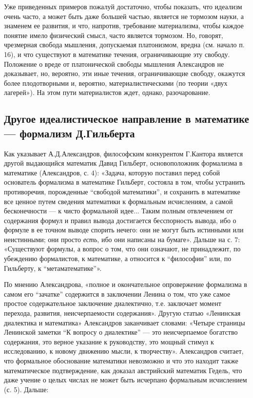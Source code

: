 Уже приведенных примеров пожалуй достаточно, чтобы показать, что
идеализм очень часто, а может быть даже большей частью, является не
тормозом науки, а знаменем ее развития, и что, напротив, требование
материализма, чтобы каждое понятие имело физический смысл, часто
является тормозом. Но, говорят, чрезмерная свобода мышления,
допускаемая платонизмом, вредна (см. начало п. 16), и что существуют в
математике течения, ограничивающие эту свободу. Положение о вреде от
платонической свободы мышления Александров не доказывает, но,
вероятно, эти иные течения, ограничивающие свободу, окажутся более
плодотворными и, вероятно, материалистическими (по теории «двух
лагерей»). На этом пути материалистов ждет, однако, разочарование.

\subsection{Другое идеалистическое направление в математике ---
формализм Д.Гильберта}

Как указывает А.Д.Александров, философским конкурентом Г.Кантора
является другой выдающийся математик Давид Гильберт, основоположник
формализма в математике (Александров, с. 4): «Задача, которую поставил
перед собой основатель формализма в математике Гильберт, состояла в
том, чтобы устранить противоречия, порожденные ``свободой
математики'', и сохранить в математике все ценное путем сведения
математики к формальным исчислениям, а самой бесконечности --- к чисто
формальной идее... Таким полным отвлечением от содержания формул и
правил вывода достигается бесспорность вывода, ибо о формуле в ее
точном выводе спорить нечего: они не могут быть истинными или
неистинными; они просто \emph{есть}, ибо они написаны на бумаге».
Дальше на с. 7: «Существуют формулы, а вопрос о том, что они означают,
не принадлежит, по убеждению формалистов, к математике, а относится к
``философии'' или, по Гильберту, к ``метаматематике''».

По мнению Александрова, «полное и окончательное опровержение
формализма в самом его ``зачатке'' содержится в заключении Ленина о
том, что уже самое простое содержательное заключение диалектично, т.е.
заключает момент перехода, развития, неисчерпаемости содержания».
Другую статью «Ленинская диалектика и математика» Александров
заканчивает словами: «Четыре страницы Ленинской заметки ``К вопросу о
диалектике'' --- это неисчерпаемое богатство содержания, это верное
указание к руководству, это мощный стимул к исследованию, к новому
движению мысли, к творчеству». Александров считает, что формальное
обоснование математики невозможно и что это находит также
математическое подтверждение, как доказал австрийский математик
Гедель, что даже учение о целых числах не может быть исчерпано
формальным исчислением (с. 5). Дальше:

